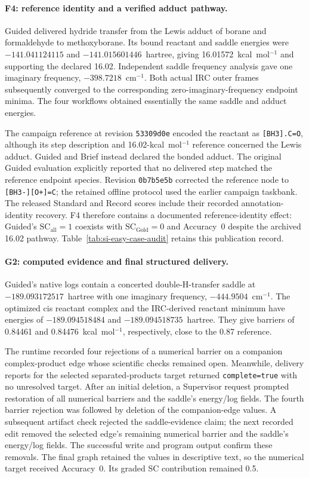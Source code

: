 \paragraph{F4: reference identity and a verified adduct pathway.}
Guided delivered hydride transfer from the Lewis adduct of borane and formaldehyde to methoxyborane. Its bound reactant and saddle energies were $-141.041124115$ and $-141.015601446$~hartree, giving 16.01572~kcal~mol$^{-1}$ and supporting the declared 16.02. Independent saddle frequency analysis gave one imaginary frequency, $-398.7218$~cm$^{-1}$. Both actual IRC outer frames subsequently converged to the corresponding zero-imaginary-frequency endpoint minima. The four workflows obtained essentially the same saddle and adduct energies.

The campaign reference at revision \texttt{53309d0e} encoded the reactant as \texttt{[BH3].C=O}, although its step description and 16.02-kcal~mol$^{-1}$ reference concerned the Lewis adduct. Guided and Brief instead declared the bonded adduct. The original Guided evaluation explicitly reported that no delivered step matched the reference endpoint species. Revision \texttt{0b7b5e5b} corrected the reference node to \texttt{[BH3-][O+]=C}; the retained offline protocol used the earlier campaign taskbank. The released Standard and Record scores include their recorded annotation-identity recovery. F4 therefore contains a documented reference-identity effect: Guided's $\mathrm{SC}_{\mathrm{all}}=1$ coexists with $\mathrm{SC}_{\mathrm{Gold}}=0$ and Accuracy~0 despite the archived 16.02 pathway. Table~\ref{tab:si-easy-case-audit} retains this publication record.

\paragraph{G2: computed evidence and final structured delivery.}
Guided's native logs contain a concerted double-H-transfer saddle at $-189.093172517$~hartree with one imaginary frequency, $-444.9504$~cm$^{-1}$. The optimized cis reactant complex and the IRC-derived reactant minimum have energies of $-189.094518484$ and $-189.094518735$~hartree. They give barriers of 0.84461 and 0.84476~kcal~mol$^{-1}$, respectively, close to the 0.87 reference.

The runtime recorded four rejections of a numerical barrier on a companion complex-product edge whose scientific checks remained open. Meanwhile, delivery reports for the selected separated-products target returned \texttt{complete=true} with no unresolved target. After an initial deletion, a Supervisor request prompted restoration of all numerical barriers and the saddle's energy/log fields. The fourth barrier rejection was followed by deletion of the companion-edge values. A subsequent artifact check rejected the saddle-evidence claim; the next recorded edit removed the selected edge's remaining numerical barrier and the saddle's energy/log fields. The successful write and program output confirm these removals. The final graph retained the values in descriptive text, so the numerical target received Accuracy~0. Its graded SC contribution remained 0.5.

